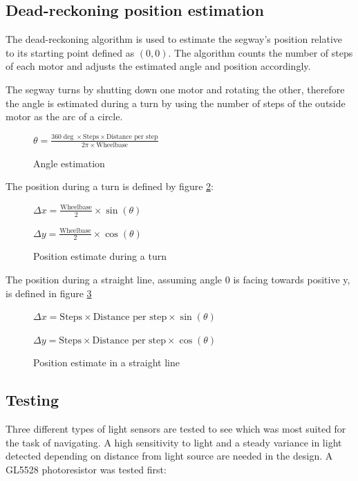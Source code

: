 \subsection{Dead-reckoning position estimation}

The dead-reckoning algorithm is used to estimate the segway's position relative to its starting point defined as \((0,0)\). The algorithm counts the number of steps of each motor and adjusts the estimated angle and position accordingly.

The segway turns by shutting down one motor and rotating the other, therefore the angle is estimated during a turn by using the number of steps of the outside motor as the arc of a circle.

\begin{figure}
    \centering
    \(\theta = \frac{360 \deg \times \text{Steps} \times \text{Distance per step} }{2 \pi \times \text{Wheelbase}}\)
    \caption{Angle estimation}
    \label{formula:angle_estimate}
\end{figure}
The position during a turn is defined by figure \ref{formula:position_estimate_turn}:

\begin{figure}
    \centering
    \(\Delta x = \frac{\text{Wheelbase}}{2} \times \sin(\theta)\)

    \(\Delta y = \frac{\text{Wheelbase}}{2} \times \cos(\theta)\)
    \caption{Position estimate during a turn}
    \label{formula:position_estimate_turn}
\end{figure}

The position during a straight line, assuming angle 0 is facing towards positive y, is defined in figure \ref{formula:position_estimate_straight}

\begin{figure}
    \centering
    \(\Delta x = \text{Steps} \times \text{Distance per step} \times \sin(\theta)\)

    \(\Delta y = \text{Steps} \times \text{Distance per step} \times \cos(\theta)\)
    \caption{Position estimate in a straight line}
    \label{formula:position_estimate_straight}
\end{figure}


\subsection{Testing}

Three different types of light sensors are tested to see which was most suited for the task of navigating. A high sensitivity to light and a steady variance in light detected depending on distance from light source are needed in the design. A GL5528 photoresistor was tested first:

